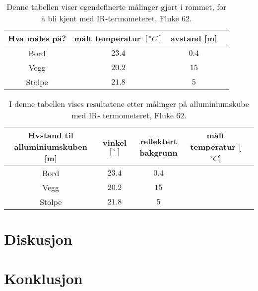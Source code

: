 \documentclass[a4paper,norsk,12pt,oneside]{article}
\begin{document}
\begin{table}[H]  
  \begin{center}
      \caption{Denne tabellen viser egendefinerte målinger gjort i rommet, for å bli kjent 
          med IR-termometeret, Fluke 62. \label{tab:ir1}}
  \begin{tabular}{|c|c|c|c|} \hline
      \textbf{Hva måles på?} & \textbf{målt temperatur \( [^\circ C]\)} & \textbf{avstand 
      [m]} \\ \hline
  Bord & \(23.4\) & \(0.4\)\\ \hline
  Vegg & \(20.2\) & \(15\)\\ \hline
  Stolpe & \(21.8\) & \(5\)\\ \hline
  \end{tabular}
  \end{center}
\end{table} 


\begin{table}[H]  
  \begin{center}
      \caption{I denne tabellen vises resultatene etter målinger på alluminiumskube med IR-  
          termometeret, Fluke 62. \label{tab:ir1}}
  \begin{tabular}{|c|c|c|c|c|} \hline
      \textbf{Hvstand til alluminiumskuben [m]} & \textbf{vinkel\( [^\circ]\)} & \textbf{reflektert bakgrunn} & målt temperatur [\(^\circ C\)] \\ \hline
  Bord & \(23.4\) & \(0.4\)\\ \hline
  Vegg & \(20.2\) & \(15\)\\ \hline
  Stolpe & \(21.8\) & \(5\)\\ \hline
  \end{tabular}
  \end{center}
\end{table} 



\section{Diskusjon}

\section{Konklusjon}


\end{document}
